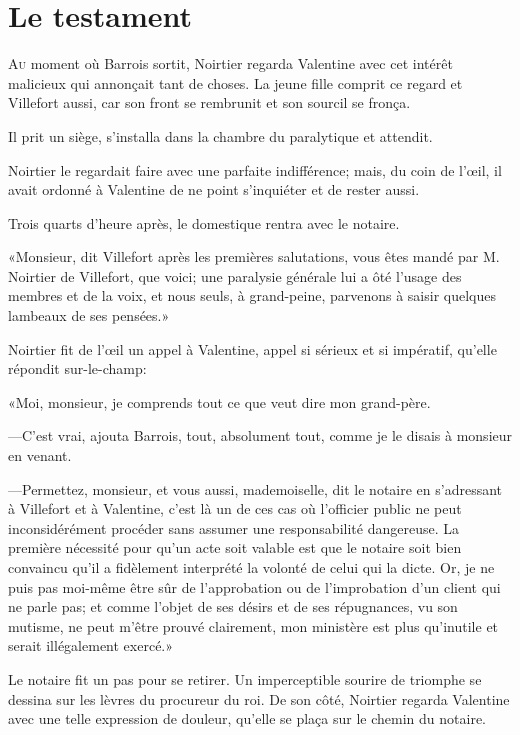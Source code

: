 \chapter{Le testament}

\lettrine{A}{u} moment où Barrois sortit, Noirtier regarda Valentine avec cet intérêt malicieux qui annonçait tant de choses. La jeune fille comprit ce regard et Villefort aussi, car son front se rembrunit et son sourcil se fronça. 

Il prit un siège, s'installa dans la chambre du paralytique et attendit. 

Noirtier le regardait faire avec une parfaite indifférence; mais, du coin de l'œil, il avait ordonné à Valentine de ne point s'inquiéter et de rester aussi. 

Trois quarts d'heure après, le domestique rentra avec le notaire. 

«Monsieur, dit Villefort après les premières salutations, vous êtes mandé par M. Noirtier de Villefort, que voici; une paralysie générale lui a ôté l'usage des membres et de la voix, et nous seuls, à grand-peine, parvenons à saisir quelques lambeaux de ses pensées.» 

Noirtier fit de l'œil un appel à Valentine, appel si sérieux et si impératif, qu'elle répondit sur-le-champ: 

«Moi, monsieur, je comprends tout ce que veut dire mon grand-père. 

—C'est vrai, ajouta Barrois, tout, absolument tout, comme je le disais à monsieur en venant. 

—Permettez, monsieur, et vous aussi, mademoiselle, dit le notaire en s'adressant à Villefort et à Valentine, c'est là un de ces cas où l'officier public ne peut inconsidérément procéder sans assumer une responsabilité dangereuse. La première nécessité pour qu'un acte soit valable est que le notaire soit bien convaincu qu'il a fidèlement interprété la volonté de celui qui la dicte. Or, je ne puis pas moi-même être sûr de l'approbation ou de l'improbation d'un client qui ne parle pas; et comme l'objet de ses désirs et de ses répugnances, vu son mutisme, ne peut m'être prouvé clairement, mon ministère est plus qu'inutile et serait illégalement exercé.» 

Le notaire fit un pas pour se retirer. Un imperceptible sourire de triomphe se dessina sur les lèvres du procureur du roi. De son côté, Noirtier regarda Valentine avec une telle expression de douleur, qu'elle se plaça sur le chemin du notaire. 


